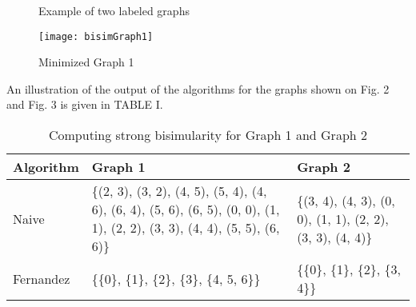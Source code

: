 

% 


\begin{figure}[h!]
\centering
{}
\label{fig:exampleGraphs}
\caption{Example of two labeled graphs}
\end{figure}

\begin{figure}[h!]
\centering
\texttt{[image: bisimGraph1]}
\caption{Minimized Graph 1}
\label{fig:bisimGraph1}
\end{figure}

An illustration of the output of the algorithms for the graphs shown on Fig. 2 and Fig. 3 is given in TABLE I.

\begin{table}[h!]
\begin{tabular}{| l | p{3.2cm}| p{3.2cm} | }
  \hline                       
  Algorithm & Graph 1 & Graph 2 \\ \hline
  Naive & \{(2, 3), (3, 2), (4, 5), 
(5, 4), (4, 6), (6, 4), (5, 6), (6, 5), (0, 0), (1, 1), (2, 2), (3, 3), (4, 4), (5, 5), (6, 6)\} & \{(3, 4), (4, 3), (0, 0), 
(1, 1), (2, 2), (3, 3), (4, 4)\} \\ \hline
  Fernandez & \{\{0\}, \{1\}, \{2\}, \{3\}, \{4, 5, 6\}\} & \{\{0\}, \{1\}, \{2\}, \{3, 4\}\} \\ \hline  
\end{tabular}
\caption{Computing strong bisimularity for Graph 1 and Graph 2}
\label{table1}
\end{table}

